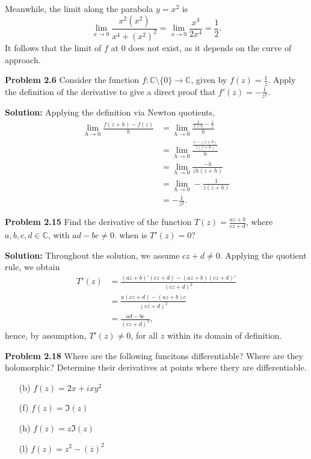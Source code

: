 \documentclass[12pt,oneside]{exam}
\newenvironment{exercise}[1]{\vspace{.1in}\noindent\textbf{Problem #1 \hspace{.05em}}}{}
\newcommand{\C}{\mathbb{C}}
\newcommand{\func}[3]{{#1} \colon {#2} \longrightarrow {#3}}
\begin{document}
Meanwhile, the limit along the parabola $y=x^2$ is 
\begin{equation*}
\lim_{x \to 0} \frac{x^2(x^2)}{x^4+(x^2)^2}  = \lim_{x \to 0} \frac{x^4}{2x^4} = \frac{1}{2}.
\end{equation*}
It follows that the limit of $f$ at $0$ does not exist, as it depends on the curve of approach. 
\vspace{1cm}

\begin{exercise}{2.6}
Consider the function $\func{f}{\mathbb{C}\setminus \{0\}}{\mathbb{C}}$, given by $f(z)=\frac{1}{z}$. Apply the definition of the derivative to give a direct proof that $f'(z)=-\frac{1}{z^2}$. 
\end{exercise}

\vspace{0.5cm}
\noindent \textbf{Solution:} Applying the definition via Newton quotients, 
\begin{align*}
\lim_{h \to 0} \frac{f(z+h)-f(z)}{h} & = \lim_{h \to 0} \frac{\frac{1}{z+h}-\frac{1}{z}}{h} \\
& =\lim_{h \to 0} \frac{\frac{z-(z+h)}{z(z+h)}}{h} \\
& =\lim_{h \to 0} \frac{-h}{zh(z+h)}\\
& = \lim_{h \to 0} -\frac{1}{z(z+h)}\\
& =-\frac{1}{z^2}.
\end{align*}

\vspace{1cm}

\begin{exercise}{2.15}
Find the derivative of the function $T(z) = \frac{az+b}{cz+d}$, where $a,b,c,d \in \C$, with $ad-bc\neq 0$. when is $T'(z)=0$?
\end{exercise}

\vspace{0.5cm}
\noindent \textbf{Solution:} Throughout the solution, we assume $cz+d \neq 0$. Applying the quotient rule, we obtain
\begin{align*}
T'(z) & = \frac{(az+b)'(cz+d)-(az+b)(cz+d)'}{(cz+d)^2}\\
& = \frac{a(cz+d)-(az+b)c}{(cz+d)^2}\\
& = \frac{ad-bc}{(cz+d)^2},
\end{align*}
hence, by assumption, $T'(z) \neq 0$, for all $z$ within its domain of definition.

\vspace{1cm}

\begin{exercise}{2.18}
Where are the following funcitons differentiable? Where are they holomorphic? Determine their derivatives at points where thery are differentiable.
\begin{itemize}
\item[(b)] $f(z)=2x+ixy^2$
\item[(f)] $f(z) = \Im(z)$
\item[(h)] $f(z)=z\Im(z)$
\item[(l)] $f(z)=z^2-(\overline{z})^2$
\end{itemize}
\end{exercise}
\end{document}
